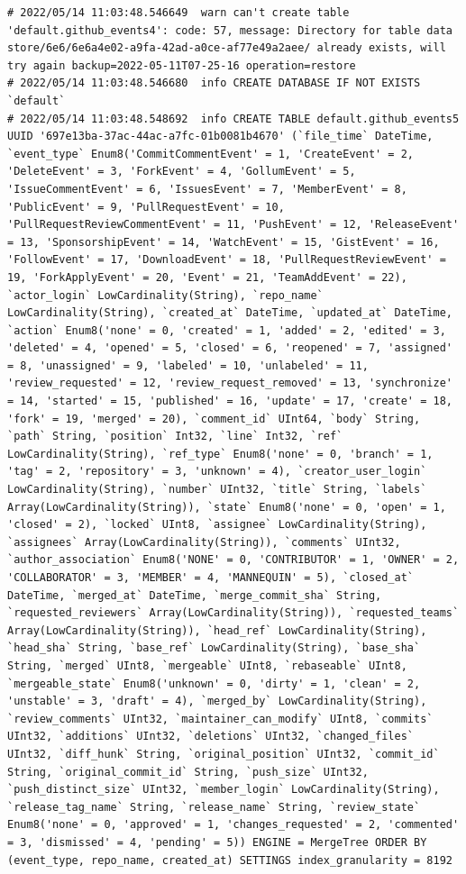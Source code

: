 \begin{verbatim}
# 2022/05/14 11:03:48.546649  warn can't create table 'default.github_events4': code: 57, message: Directory for table data store/6e6/6e6a4e02-a9fa-42ad-a0ce-af77e49a2aee/ already exists, will try again backup=2022-05-11T07-25-16 operation=restore
# 2022/05/14 11:03:48.546680  info CREATE DATABASE IF NOT EXISTS `default`
# 2022/05/14 11:03:48.548692  info CREATE TABLE default.github_events5 UUID '697e13ba-37ac-44ac-a7fc-01b0081b4670' (`file_time` DateTime, `event_type` Enum8('CommitCommentEvent' = 1, 'CreateEvent' = 2, 'DeleteEvent' = 3, 'ForkEvent' = 4, 'GollumEvent' = 5, 'IssueCommentEvent' = 6, 'IssuesEvent' = 7, 'MemberEvent' = 8, 'PublicEvent' = 9, 'PullRequestEvent' = 10, 'PullRequestReviewCommentEvent' = 11, 'PushEvent' = 12, 'ReleaseEvent' = 13, 'SponsorshipEvent' = 14, 'WatchEvent' = 15, 'GistEvent' = 16, 'FollowEvent' = 17, 'DownloadEvent' = 18, 'PullRequestReviewEvent' = 19, 'ForkApplyEvent' = 20, 'Event' = 21, 'TeamAddEvent' = 22), `actor_login` LowCardinality(String), `repo_name` LowCardinality(String), `created_at` DateTime, `updated_at` DateTime, `action` Enum8('none' = 0, 'created' = 1, 'added' = 2, 'edited' = 3, 'deleted' = 4, 'opened' = 5, 'closed' = 6, 'reopened' = 7, 'assigned' = 8, 'unassigned' = 9, 'labeled' = 10, 'unlabeled' = 11, 'review_requested' = 12, 'review_request_removed' = 13, 'synchronize' = 14, 'started' = 15, 'published' = 16, 'update' = 17, 'create' = 18, 'fork' = 19, 'merged' = 20), `comment_id` UInt64, `body` String, `path` String, `position` Int32, `line` Int32, `ref` LowCardinality(String), `ref_type` Enum8('none' = 0, 'branch' = 1, 'tag' = 2, 'repository' = 3, 'unknown' = 4), `creator_user_login` LowCardinality(String), `number` UInt32, `title` String, `labels` Array(LowCardinality(String)), `state` Enum8('none' = 0, 'open' = 1, 'closed' = 2), `locked` UInt8, `assignee` LowCardinality(String), `assignees` Array(LowCardinality(String)), `comments` UInt32, `author_association` Enum8('NONE' = 0, 'CONTRIBUTOR' = 1, 'OWNER' = 2, 'COLLABORATOR' = 3, 'MEMBER' = 4, 'MANNEQUIN' = 5), `closed_at` DateTime, `merged_at` DateTime, `merge_commit_sha` String, `requested_reviewers` Array(LowCardinality(String)), `requested_teams` Array(LowCardinality(String)), `head_ref` LowCardinality(String), `head_sha` String, `base_ref` LowCardinality(String), `base_sha` String, `merged` UInt8, `mergeable` UInt8, `rebaseable` UInt8, `mergeable_state` Enum8('unknown' = 0, 'dirty' = 1, 'clean' = 2, 'unstable' = 3, 'draft' = 4), `merged_by` LowCardinality(String), `review_comments` UInt32, `maintainer_can_modify` UInt8, `commits` UInt32, `additions` UInt32, `deletions` UInt32, `changed_files` UInt32, `diff_hunk` String, `original_position` UInt32, `commit_id` String, `original_commit_id` String, `push_size` UInt32, `push_distinct_size` UInt32, `member_login` LowCardinality(String), `release_tag_name` String, `release_name` String, `review_state` Enum8('none' = 0, 'approved' = 1, 'changes_requested' = 2, 'commented' = 3, 'dismissed' = 4, 'pending' = 5)) ENGINE = MergeTree ORDER BY (event_type, repo_name, created_at) SETTINGS index_granularity = 8192

\end{verbatim}
